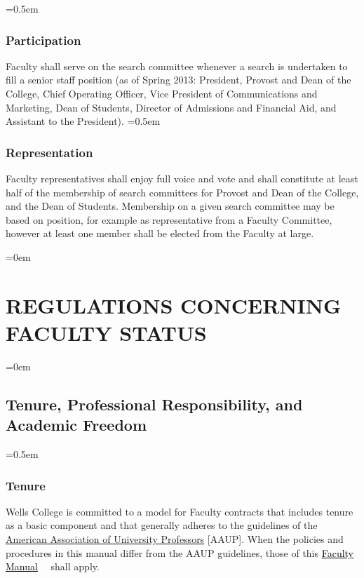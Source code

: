 \documentclass{manual}
\let\stdsection\section %
\renewcommand\section{\newpage\stdsection}
\newcommand{\keyword}[1]{\textcolor{black}{#1}}
\newcommand{\facman}{\keyword{\underline{Faculty Manual}}~}
\let\oldsection\section
\renewcommand\section{\leftskip=0em\oldsection}
\let\oldsubsection\subsection
\renewcommand\subsection{\leftskip=0em\oldsubsection}
\let\oldsubsubsection\subsubsection
\renewcommand\subsubsection{\leftskip=0.5em\oldsubsubsection}
\begin{document}
\subsubsection{Participation}
Faculty shall serve on the search committee whenever a search is undertaken to fill a senior staff position (as of Spring 2013: President, Provost and Dean of the College, Chief Operating Officer, Vice President of Communications and Marketing, Dean of Students, Director of Admissions and Financial Aid, and Assistant to the President).
\subsubsection{Representation}
Faculty representatives shall enjoy full voice and vote and shall constitute at least half of the membership of search committees for Provost and Dean of the College, and the Dean of Students. Membership on a given search committee may be based on position, for example as representative from a Faculty Committee, however at least one member shall be elected from the Faculty at large.


\section{REGULATIONS CONCERNING FACULTY STATUS}\label{art:RegulationsConcerningFacultyStatus}

\subsection{Tenure, Professional Responsibility, and Academic Freedom}\label{sec:TenureProfessionalResponsibilityAndAcademicFreedom}

\subsubsection{Tenure}

Wells College is committed to a model for Faculty contracts that includes tenure as a basic component and that generally adheres to the guidelines of the \href{http://www.aaup.org/AAUP/}{American Association of University Professors} [AAUP]. When the policies and procedures in this manual differ from the AAUP guidelines, those of this \facman~ shall apply.
\end{document}
